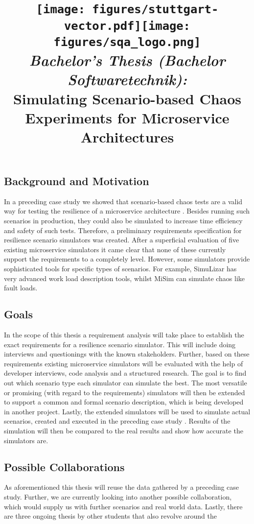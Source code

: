\documentclass[a4paper,12pt]{article}
\date{}
\title{
\texttt{[image: figures/stuttgart-vector.pdf]}\hfill{\texttt{[image: figures/sqa\_logo.png]}}
\quad \\ [0.5cm]
{\large \textit{Bachelor's Thesis (Bachelor Softwaretechnik):}} \\ [1mm]
{\Large Simulating Scenario-based Chaos Experiments for Microservice Architectures}
}
\begin{document}
	

\maketitle

\thispagestyle{empty}

\vspace{-2.5cm}


\subsection*{Background and Motivation}
In a preceding case study we showed that scenario-based chaos tests are a valid way for testing the resilience of a microservice architecture \cite{CaseStudyDatev}. Besides running such scenarios in production, they could also be simulated to increase time efficiency and safety of such tests. Therefore, a preliminary requirements specification for resilience scenario simulators was created. After a superficial evaluation of five existing microservice simulators it came clear that none of these currently support the requirements to a completely level. 
However, some simulators provide sophisticated tools for specific types of scenarios. For example, SimuLizar \cite{SimuLizar1} has very advanced work load description tools, whilst MiSim \cite{MiSim} can simulate chaos like fault loads. 

\subsection*{Goals}
In the scope of this thesis a requirement analysis will take place to establish the exact requirements for a resilience scenario simulator. This will include doing interviews and questionings with the known stakeholders.
Further, based on these requirements existing microservice simulators will be evaluated with the help of developer interviews, code analysis and a structured research. The goal is to find out which scenario type each simulator can simulate the best.
The most versatile or promising (with regard to the requirements) simulators will then be extended to support a common and formal scenario description, which is being developed in another project.
Lastly, the extended simulators will be used to simulate actual scenarios, created and executed in the preceding case study \cite{CaseStudyDatev}. Results of the simulation will then be compared to the real results and show how accurate the simulators are.

\subsection*{Possible Collaborations}
As aforementioned this thesis will reuse the data gathered by a preceding case study. Further, we are currently looking into another possible collaboration, which would supply us with further scenarios and real world data. 
Lastly, there are three ongoing thesis by other students that also  revolve around the
\end{document}
